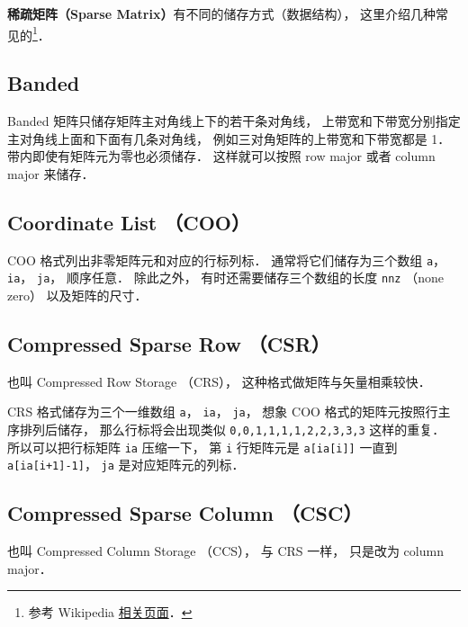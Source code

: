 
\textbf{稀疏矩阵（Sparse Matrix）}有不同的储存方式（数据结构）， 这里介绍几种常见的\footnote{参考 Wikipedia \href{https://en.wikipedia.org/wiki/Sparse_matrix}{相关页面}．}．

\subsection{Banded}
Banded 矩阵只储存矩阵主对角线上下的若干条对角线， 上带宽和下带宽分别指定主对角线上面和下面有几条对角线， 例如三对角矩阵的上带宽和下带宽都是 1． 带内即使有矩阵元为零也必须储存． 这样就可以按照 row major 或者 column major 来储存．

\subsection{Coordinate List （COO）}
COO 格式列出非零矩阵元和对应的行标列标． 通常将它们储存为三个数组 \verb|a|， \verb|ia|， \verb|ja|， 顺序任意． 除此之外， 有时还需要储存三个数组的长度 \verb|nnz| （none zero） 以及矩阵的尺寸．

\subsection{Compressed Sparse Row （CSR）}
也叫 Compressed Row Storage （CRS）， 这种格式做矩阵与矢量相乘较快．

CRS 格式储存为三个一维数组 \verb|a|， \verb|ia|， \verb|ja|， 想象 COO 格式的矩阵元按照行主序排列后储存， 那么行标将会出现类似 \verb|0,0,1,1,1,1,2,2,3,3,3| 这样的重复． 所以可以把行标矩阵 \verb|ia| 压缩一下，  第 \verb|i| 行矩阵元是 \verb|a[ia[i]]| 一直到 \verb|a[ia[i+1]-1]|， \verb|ja| 是对应矩阵元的列标．

\subsection{Compressed Sparse Column （CSC）}
也叫 Compressed Column Storage （CCS）， 与 CRS 一样， 只是改为 column major．
